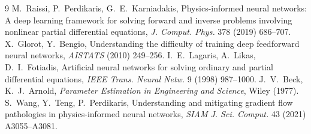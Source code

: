 \documentclass[10pt]{article}
\begin{document}
\begin{thebibliography}{9}\small
{} M.~Raissi, P.~Perdikaris, G.~E.~Karniadakis, Physics-informed neural networks: A deep learning framework for solving forward and inverse problems involving nonlinear partial differential equations, \emph{J. Comput. Phys.} 378 (2019) 686--707.
 X.~Glorot, Y.~Bengio, Understanding the difficulty of training deep feedforward neural networks, \emph{AISTATS} (2010) 249--256.
 I.~E.~Lagaris, A.~Likas, D.~I.~Fotiadis, Artificial neural networks for solving ordinary and partial differential equations, \emph{IEEE Trans. Neural Netw.} 9 (1998) 987--1000.
 J.~V.~Beck, K.~J.~Arnold, \emph{Parameter Estimation in Engineering and Science}, Wiley (1977).
 S.~Wang, Y.~Teng, P.~Perdikaris, Understanding and mitigating gradient flow pathologies in physics-informed neural networks, \emph{SIAM J. Sci. Comput.} 43 (2021) A3055--A3081.
\end{thebibliography}
\end{document}
